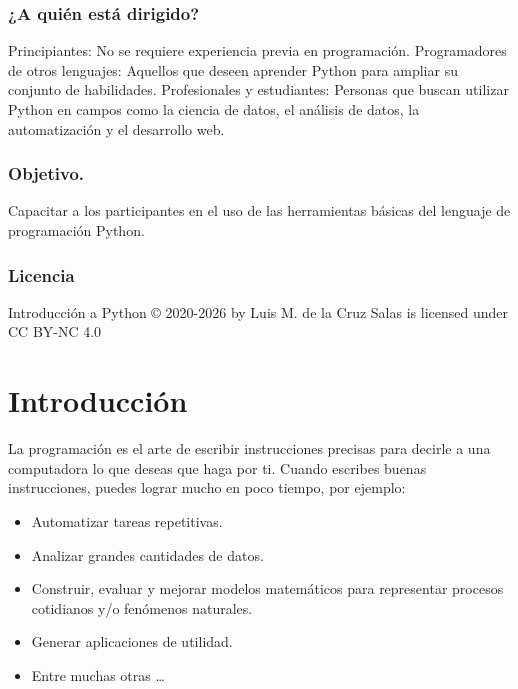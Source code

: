 \documentclass[
  spanish,
  letterpaper,
]{scrbook}
\providecommand{\tightlist}{%
  \setlength{\itemsep}{0pt}\setlength{\parskip}{0pt}}
\theoremstyle{definition}
\theoremstyle{remark}
\begin{document}
\section*{¿A quién está dirigido?}\label{a-quiuxe9n-estuxe1-dirigido}


Principiantes: No se requiere experiencia previa en programación.
Programadores de otros lenguajes: Aquellos que deseen aprender Python
para ampliar su conjunto de habilidades. Profesionales y estudiantes:
Personas que buscan utilizar Python en campos como la ciencia de datos,
el análisis de datos, la automatización y el desarrollo web.

\section*{Objetivo.}\label{objetivo.}


Capacitar a los participantes en el uso de las herramientas básicas del
lenguaje de programación Python.

\section*{Licencia}\label{licencia}


Introducción a Python © 2020-2026 by Luis M. de la Cruz Salas is
licensed under CC BY-NC 4.0

\part{Introducción}

La programación es el arte de escribir instrucciones precisas para
decirle a una computadora lo que deseas que haga por ti. Cuando escribes
buenas instrucciones, puedes lograr mucho en poco tiempo, por ejemplo:

\begin{itemize}
\tightlist
\item
  Automatizar tareas repetitivas.
\item
  Analizar grandes cantidades de datos.
\item
  Construir, evaluar y mejorar modelos matemáticos para representar
  procesos cotidianos y/o fenómenos naturales.
\item
  Generar aplicaciones de utilidad.
\item
  Entre muchas otras \ldots{}
\end{itemize}
\end{document}
